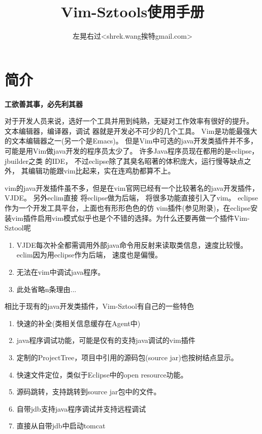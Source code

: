 \documentclass[oneside,openany]{book}
\title{Vim-Sztools使用手册}
\author{左晃右过<shrek.wang挨特gmail.com>}
\begin{document}
\maketitle

\chapter{简介}

  \begin{center}
    \large\textbf{工欲善其事，必先利其器}
  \end{center}

  对于开发人员来说，选好一个工具并用到纯熟，无疑对工作效率有很好的提升。 文本编辑器，编译器，调试
器就是开发必不可少的几个工具。  Vim是功能最强大的文本编辑器之一(另一个是Emacs)。 
但是Vim中可选的java开发类插件并不多， 可能是用Vim做java开发的程序员太少了。 许多Java程序员现在都用的是eclipse，jbuilder之类
的IDE， 不过eclipse除了其臭名昭著的体积庞大，运行慢等缺点之外， 其编辑功能跟vim比起来，实在连鸡肋都算不上。 

  vim的java开发插件虽不多，但是在vim官网已经有一个比较著名的java开发插件，VJDE。 另外eclim直接
将eclipse做为后端， 将很多功能直接引入了vim。 eclipse作为一个开发工具平台，上面也有形形色色的仿
vim插件(参见附录)，在eclipse安装vim插件启用vim模式似乎也是个不错的选择。为什么还要再做一个插件Vim-Sztool呢
  
  \begin{enumerate}
    \item VJDE每次补全都需调用外部java命令用反射来读取类信息，速度比较慢。eclim因为用eclipse作为后端， 速度也是偏慢。
    \item 无法在vim中调试java程序。
    \item 此处省略n条理由...
  \end{enumerate}

  相比于现有的java开发类插件，Vim-Sztool有自己的一些特色
  \begin{enumerate}
    \item 快速的补全(类相关信息缓存在Agent中)
    \item java程序调试功能，可能是仅有的支持java调试的vim插件
    \item 定制的ProjectTree，项目中引用的源码包(source jar)也按树结点显示。
    \item 快速文件定位，类似于Eclipse中的open resource功能。
    \item 源码跳转，支持跳转到source jar包中的文件。
    \item 自带jdb支持java程序调试并支持远程调试
    \item 直接从自带jdb中启动tomcat
  \end{enumerate}
\end{document}
